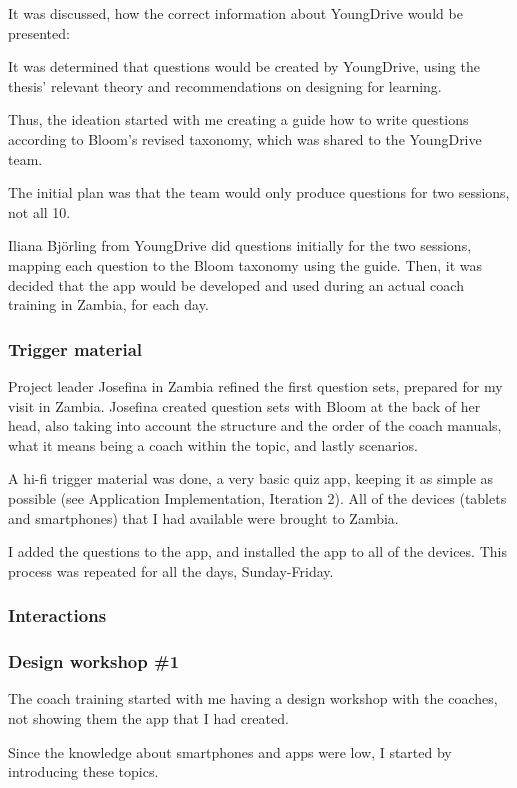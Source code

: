 It was discussed, how the correct information about YoungDrive would be presented:

It was determined that questions would be created by YoungDrive, using the thesis' relevant theory and recommendations on designing for learning.

Thus, the ideation started with me creating a guide how to write questions according to Bloom's revised taxonomy, which was shared to the YoungDrive team.

The initial plan was that the team would only produce questions for two sessions, not all 10.

Iliana Björling from YoungDrive did questions initially for the two sessions, mapping each question to the Bloom taxonomy using the guide. Then, it was decided that the app would be developed and used during an actual coach training in Zambia, for each day.

\subsubsection*{Trigger material}
Project leader Josefina in Zambia refined the first question sets, prepared for my visit in Zambia. Josefina created question sets with Bloom at the back of her head, also taking into account the structure and the order of the coach manuals, what it means being a coach within the topic, and lastly scenarios.

A hi-fi trigger material was done, a very basic quiz app, keeping it as simple as possible (see Application Implementation, Iteration 2). All of the devices (tablets and smartphones) that I had available were brought to Zambia.

I added the questions to the app, and installed the app to all of the devices. This process was repeated for all the days, Sunday-Friday.

\subsubsection*{Interactions}

\subsubsection{Design workshop \#1}
The coach training started with me having a design workshop with the coaches, not showing them the app that I had created.

Since the knowledge about smartphones and apps were low, I started by introducing these topics.

